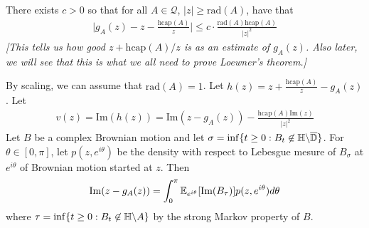 \documentclass[12pt,a4paper]{article}
\newenvironment{proof}
{\begin{changemargin}{0.5cm}{0.5cm} 
	}%
	{\end{changemargin}
}
\newenvironment{p}
{\begin{proof} 
	}%
	{\end{proof}
}
\begin{document}
\s

\prop There exists $c>0$ so that for all $A\in \mathscr{Q}$, $|z| \geq \text{rad}(A)$, have that
\begin{align*}
\Big|g_A(z) - z - \frac{\text{hcap}(A)}{z}\Big| \leq c \cdot \frac{\text{rad}(A) \text{hcap}(A)}{|z|^2}
\end{align*}
\emph{[This tells us how good $z+ \text{hcap}(A)/z$ is as an estimate of $g_A(z)$. Also later, we will see that this is what we all need to prove Loewner's theorem.]}
\begin{p}
\pf By scaling, we can assume that $\text{rad}(A)=1$. Let $h(z) = z+ \frac{\text{hcap}(A)}{z} - g_A(z)$. Let 
\begin{align*}
v(z) = \text{Im}(h(z)) = \text{Im}(z- g_A(z)) - \frac{\text{hcap}(A)\text{Im}(z)}{|z|^2}
\end{align*}
Let $B$ be a complex Brownian motion and let $\sigma = \inf \{t\geq 0: B_t \not\in \mathbb{H} \backslash \overline{\mathbb{D}}\}$. For $\theta \in [0, \pi]$, let $p(z, e^{i\theta})$ be the density with respect to Lebesgue mesure of $B_{\sigma}$ at $e^{i\theta}$ of Brownian motion started at $z$. Then
\begin{align*}
\text{Im}(z- g_A(z)) = \int_0^{\pi} \mathbb{E}_{e^{i\theta}}[\text{Im}(B_{\tau})] p(z, e^{i\theta})d\theta
\end{align*}
where $\tau = \inf \{t\geq 0 : B_t \not\in \mathbb{H} \backslash A\}$ by the strong Markov property of $B$.


\end{p}
\end{document}
